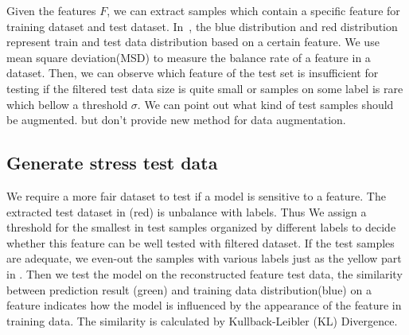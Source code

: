 Given the features $F$, we can extract samples which contain a specific 
feature for training dataset and test dataset. In~, the blue 
distribution and red distribution represent  train and test data distribution based on 
a certain feature. We use mean square deviation(MSD) to measure the balance rate 
of a feature in a dataset. Then, we can observe which feature of the test set 
is insufficient for testing if the filtered test data size is quite small or samples on 
some label is rare which bellow a threshold $\sigma$. 
We can point out what kind of test samples should be augmented. 
but don't provide new method for data augmentation. 



\subsection{Generate stress test data}
\label{sec:generate}

We require a more fair dataset to test if a model is sensitive to a feature.
The extracted test dataset in  (red) is unbalance with 
labels. Thus We assign a threshold for the smallest in test samples 
organized by different labels to decide whether this feature can be well tested 
with filtered dataset. If the test samples are adequate, we even-out the samples 
with various labels just as the yellow part in . Then we test the model 
on the reconstructed feature test data, the similarity between prediction result (green) and 
training data distribution(blue) on a feature indicates how the model is influenced by 
the appearance of the feature in training data. The similarity is 
calculated by Kullback-Leibler (KL) Divergence.

